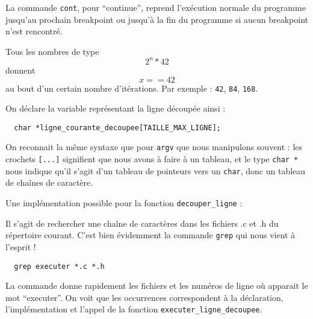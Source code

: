\documentclass[10pt]{article}
\begin{document}
\begin{enumerate}[label=\textbf{[\alph*]}]
\item La commande \texttt{cont}, pour ``continue'', reprend
  l'exécution normale du programme jusqu'au prochain breakpoint ou
  jusqu'à la fin du programme si aucun breakpoint n'est rencontré.

\item Tous les nombres de type $$2^n * 42$$ donnent $$x == 42$$ au
  bout d'un certain nombre d'itérations. Par exemple : \texttt{42},
  \texttt{84}, \texttt{168}.

\item On déclare la variable représentant la ligne découpée ainsi :

\begin{verbatim}
  char *ligne_courante_decoupee[TAILLE_MAX_LIGNE];
\end{verbatim}

On reconnait la même syntaxe que pour \texttt{argv} que nous
manipulons souvent : les crochets \texttt{[...]} signifient que nous
avons à faire à un tableau, et le type \texttt{char *} nous indique
qu'il s'agit d'un tableau de pointeurs vers un \texttt{char}, donc un
tableau de chaînes de caractère.

\item Une implémentation possible pour la fonction
  \texttt{decouper\_ligne} :

  

\item Il s'agit de rechercher une chaîne de caractères dans les
  fichiers .c et .h du répertoire courant. C'est bien évidemment la commande
  \texttt{grep} qui nous vient à l'esprit !

\begin{verbatim}
  grep executer *.c *.h
\end{verbatim}

La commande donne rapidement les fichiers et les numéros de ligne où
apparait le mot ``executer''. On voit que les occurrences
correspondent à la déclaration, l'implémentation et l'appel de la
fonction \texttt{executer\_ligne\_decoupee}.

\end{enumerate}
\end{document}
